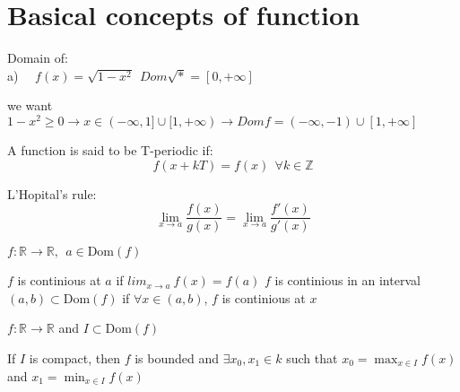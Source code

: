 \documentclass[12pt, a4paper]{book}
\begin{document}
\section{Basical concepts of function}

\begin{exmp}
  Domain of: \\
  a) \ \ $f(x) = \sqrt{1-x^2} \ \ Dom\sqrt{*} = [0, +\infty]$

  we want $ 1-x^2 \geq 0 \rightarrow x \in (-\infty, 1] \cup [1, +\infty) \rightarrow Dom f = (-\infty, -1) \cup [1, +\infty] $
\end{exmp}


\begin{defn}
  A function is said to be T-periodic if:
  \[
    f(x + kT) = f(x) \ \ \forall k \in\mathbb{Z}
  \]
\end{defn}

\begin{thm}
  L'Hopital's rule:
  \[
    \lim_{x \rightarrow a} \dfrac{f(x)}{g(x)} = \lim_{x \rightarrow a} \dfrac{f'(x)}{g'(x)}
  \]
\end{thm}

\begin{defn}
  $f: \mathbb{R} \longrightarrow \mathbb{R}, \ \ a \in \text{Dom}(f)$
  \begin{center}
    $f$ is continious at $a$ if $lim_{x \rightarrow a}\ f(x) = f(a)$
    $f$ is continious in an interval $(a, b) \subset \text{Dom}(f)$ 
    if $\forall x \in (a, b)$, $f$ is continious at $x$
  \end{center}
\end{defn}

\begin{thm}
  $f: \mathbb{R} \longrightarrow \mathbb{R}$ and $I \subset \text{Dom}(f)$
  \begin{center}
    If $I$ is compact, then $f$ is bounded and $\exists x_0,x_1 \in k$ such that $x_0 = \max_{x \in I} f(x)$ 
    and $x_1 = \min_{x \in I} f(x)$
  \end{center}
\end{thm}
\end{document}
